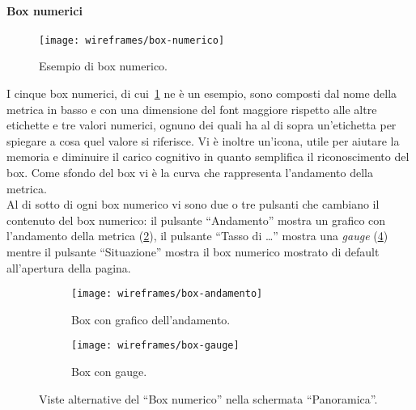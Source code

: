 \paragraph{Box numerici}
\begin{figure}[H]
    \centering
    \texttt{[image: wireframes/box-numerico]}
    \caption{Esempio di box numerico.}\label{fig:box-numerico}
\end{figure}

I cinque box numerici, di cui~\ref{fig:box-numerico} ne è un esempio, sono composti dal nome della metrica in basso e con una dimensione del font maggiore rispetto alle altre etichette e tre valori numerici, ognuno dei quali ha al di sopra un'etichetta per spiegare a cosa quel valore si riferisce. Vi è inoltre un'icona, utile per aiutare la memoria e diminuire il carico cognitivo in quanto semplifica il riconoscimento del box. Come sfondo del box vi è la curva che rappresenta l'andamento della metrica.\\
Al di sotto di ogni box numerico vi sono due o tre pulsanti che cambiano il contenuto del box numerico: il pulsante ``Andamento'' mostra un grafico con l'andamento della metrica (\ref{fig:box-andamento}), il pulsante ``Tasso di \dots'' mostra una \textit{gauge} (\ref{fig:box-gauge}) mentre il pulsante ``Situazione'' mostra il box numerico mostrato di default all'apertura della pagina.

\begin{figure}[H]
    \begin{subfigure}[b]{0.5\textwidth}
        \centering
        \texttt{[image: wireframes/box-andamento]}
        \caption{Box con grafico dell'andamento.}\label{fig:box-andamento}
    \end{subfigure}
\hfill
    \begin{subfigure}[b]{0.5\textwidth}
        \centering
        \texttt{[image: wireframes/box-gauge]}
        \caption{Box con gauge.}\label{fig:box-gauge}
    \end{subfigure}
    \caption{Viste alternative del ``Box numerico'' nella schermata ``Panoramica''.}
\end{figure}

